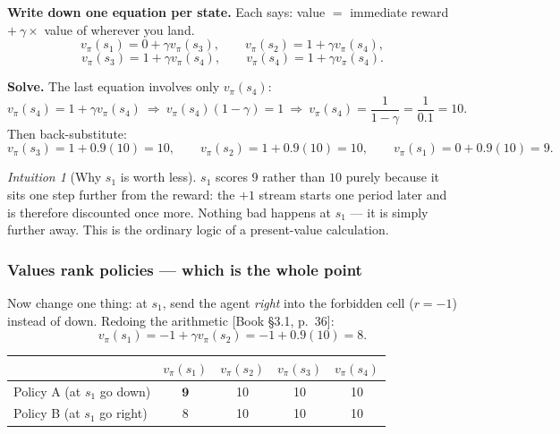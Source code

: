\documentclass[11pt, letterpaper]{article}
\theoremstyle{runin}
\theoremstyle{runinplain}
\theoremstyle{remark}
\newtheorem*{intuition}{Intuition}
\newcommand{\bkin}[1]{{\color{bookblue}\small[\textsf{Book #1}]}}
\begin{document}
\textbf{Write down one equation per state.} Each says: value $=$ immediate reward
$+\ \gamma\times$ value of wherever you land.
\[
  v_\pi(s_1)=0+\gamma v_\pi(s_3),\qquad
  v_\pi(s_2)=1+\gamma v_\pi(s_4),
\]
\[
  v_\pi(s_3)=1+\gamma v_\pi(s_4),\qquad
  v_\pi(s_4)=1+\gamma v_\pi(s_4).
\]

\textbf{Solve.} The last equation involves only $v_\pi(s_4)$:
\[
  v_\pi(s_4)=1+\gamma v_\pi(s_4)
  \ \Longrightarrow\ v_\pi(s_4)(1-\gamma)=1
  \ \Longrightarrow\ v_\pi(s_4)=\frac{1}{1-\gamma}=\frac{1}{0.1}=10 .
\]
Then back-substitute:
\[
  v_\pi(s_3)=1+0.9(10)=10,\qquad
  v_\pi(s_2)=1+0.9(10)=10,\qquad
  v_\pi(s_1)=0+0.9(10)=9 .
\]

\begin{center}
\end{center}

\begin{intuition}[Why $s_1$ is worth less]
$s_1$ scores $9$ rather than $10$ purely because it sits one step further from the
reward: the $+1$ stream starts one period later and is therefore discounted once
more. Nothing bad happens at $s_1$ --- it is simply further away. This is the ordinary
logic of a present-value calculation.
\end{intuition}

\subsubsection*{Values rank policies --- which is the whole point}

Now change one thing: at $s_1$, send the agent \emph{right} into the forbidden cell
($r=-1$) instead of down. Redoing the arithmetic \bkin{\S3.1, p.~36}:
\[
  v_\pi(s_1)=-1+\gamma v_\pi(s_2)=-1+0.9(10)=8 .
\]

\begin{center}
\small
\begin{tabular}{@{}lcccc@{}}
\toprule
& $v_\pi(s_1)$ & $v_\pi(s_2)$ & $v_\pi(s_3)$ & $v_\pi(s_4)$\\
\midrule
Policy A (at $s_1$ go down)  & $\mathbf{9}$ & 10 & 10 & 10\\
Policy B (at $s_1$ go right) & $8$          & 10 & 10 & 10\\
\bottomrule
\end{tabular}
\end{center}
\end{document}
